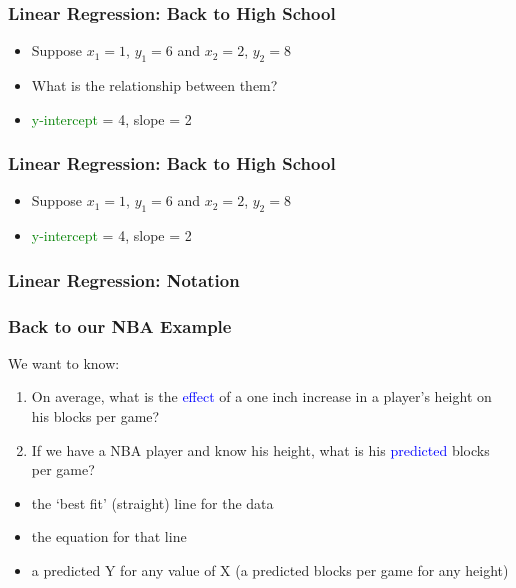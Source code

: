 \documentclass[handout]{beamer}
\newcommand{\blue}{\textcolor{blue}}
\newcommand{\green}{\textcolor{green}}
\begin{document}
\begin{frame}
 \frametitle<+->{Linear Regression: Back to High School}
 \begin{itemize}[<+->]
   \item Suppose $x_1=1$, $y_1=6$ and $x_2=2$, $y_2=8$
   \item What is the relationship between them?
   \pause
   \item \green{y-intercept} = 4, \alert{slope} = 2
 \end{itemize}
\end{frame}

\begin{frame}
 \frametitle{Linear Regression: Back to High School}
 \begin{itemize}[<+->]
   \item Suppose $x_1=1$, $y_1=6$ and $x_2=2$, $y_2=8$
   \item \green{y-intercept} = 4, \alert{slope} = 2
   \bigskip
 \end{itemize}
\end{frame}

\begin{frame}
 \frametitle{Linear Regression: Notation}
\end{frame}

\begin{frame}
 \frametitle<+->{Back to our NBA Example}
 We want to know:
 \begin{enumerate}
   \item On average, what is the \blue{effect} of a one inch increase in a player's height on his blocks per game?
   \item If we have a NBA player and know his height, what is his \blue{predicted} blocks per game?
 \end{enumerate}
  \pause
 \begin{itemize}
   \item the \alert{`best fit'} (straight) line for the data
   \item the \alert{equation} for that line
   \item a predicted Y for any value of X (a predicted blocks per game for any height)
 \end{itemize}
\end{frame}
\end{document}
